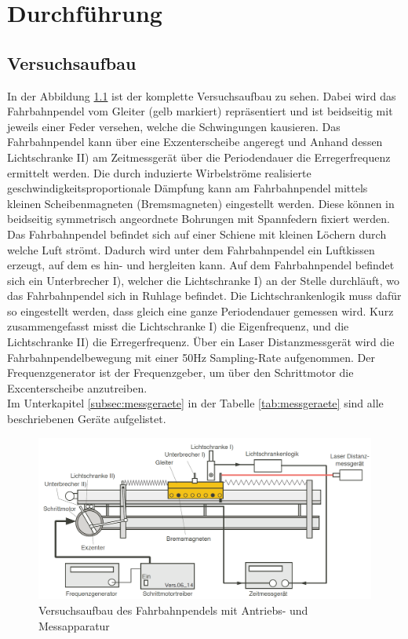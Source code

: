 \chapter{Durchführung}
\thispagestyle{fancy} \label{chap:durchfuehrung}
\section{Versuchsaufbau}
In der Abbildung \ref{fig:versuchsaufbau} ist der komplette Versuchsaufbau zu sehen. Dabei wird das Fahrbahnpendel vom Gleiter (gelb markiert) repräsentiert und ist beidseitig mit jeweils einer Feder versehen, welche die Schwingungen kausieren. Das Fahrbahnpendel kann über eine Exzenterscheibe angeregt und Anhand dessen Lichtschranke II) am Zeitmessgerät über die Periodendauer die Erregerfrequenz ermittelt werden. Die durch induzierte Wirbelströme realisierte geschwindigkeitsproportionale Dämpfung kann am Fahrbahnpendel mittels kleinen Scheibenmagneten (Bremsmagneten) eingestellt werden. Diese können in beidseitig symmetrisch angeordnete Bohrungen mit Spannfedern fixiert werden. Das Fahrbahnpendel befindet sich auf einer Schiene mit kleinen Löchern durch welche Luft strömt. Dadurch wird unter dem Fahrbahnpendel ein Luftkissen erzeugt, auf dem es hin- und hergleiten kann. Auf dem Fahrbahnpendel befindet sich ein Unterbrecher I), welcher die Lichtschranke I) an der Stelle durchläuft, wo das Fahrbahnpendel sich in Ruhlage befindet. Die Lichtschrankenlogik muss dafür so eingestellt werden, dass gleich eine ganze Periodendauer gemessen wird. Kurz zusammengefasst misst die Lichtschranke I) die Eigenfrequenz, und die Lichtschranke II) die Erregerfrequenz. Über ein Laser Distanzmessgerät wird die Fahrbahnpendelbewegung mit einer 50Hz Sampling-Rate aufgenommen. Der Frequenzgenerator ist der Frequenzgeber, um über den Schrittmotor die Excenterscheibe anzutreiben.
\\[0.5cm]
Im Unterkapitel \ref{subsec:messgeraete} in der Tabelle \ref{tab:messgeraete} sind alle beschriebenen Geräte aufgelistet.
\\[0.7cm]
\begin{figure}[h]
	\centering
	\includegraphics[width=17cm]{Bilder/versuchsaufbau.png} 
	\caption{Versuchsaufbau des Fahrbahnpendels mit Antriebs- und Messapparatur \cite{w6}}
	\label{fig:versuchsaufbau}
\end{figure}
\newpage
